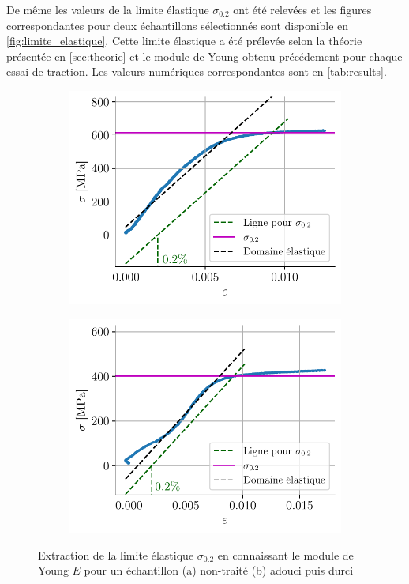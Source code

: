 De même les valeurs de la limite élastique $\sigma_{0.2}$ ont été relevées et les figures correspondantes pour deux échantillons sélectionnés sont disponible en \autoref{fig:limite_elastique}. Cette limite élastique a été prélevée selon la théorie présentée en \autoref{sec:theorie} et le module de Young obtenu précédement pour chaque essai de traction. Les valeurs numériques correspondantes sont en \autoref{tab:results}.

\begin{figure}[H]
    \centering
    \begin{subfigure}{0.48\linewidth}
        \centering
        \includegraphics[width=\linewidth]{figures/froid2_sigma2.pdf}
        \caption{}
        \label{fig:froid1_lim}
    \end{subfigure}
    \begin{subfigure}{0.48\linewidth}
        \centering
        \includegraphics[width=\linewidth]{figures/tiede6_sigma2.pdf}
        \caption{}
        \label{fig:tiede6_lim}
    \end{subfigure}
    \caption{Extraction de la limite élastique $\sigma_{0.2}$ en connaissant le module de Young $E$ pour un échantillon (a) non-traité (b) adouci puis durci}
    \label{fig:limite_elastique}
\end{figure}


